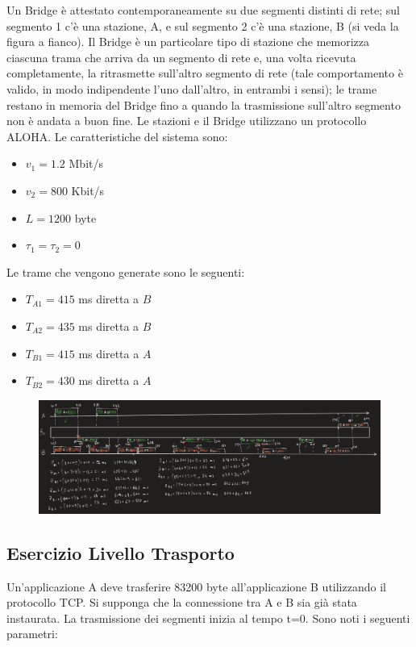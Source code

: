 \documentclass[a4paper]{article}
\begin{document}
Un Bridge è attestato contemporaneamente su due segmenti distinti di
rete; sul segmento 1 c’è una stazione, A, e sul segmento 2 c’è una
stazione, B (si veda la figura a fianco). Il Bridge è un particolare tipo di
stazione che memorizza ciascuna trama che arriva da un segmento di
rete e, una volta ricevuta completamente, la ritrasmette sull’altro
segmento di rete (tale comportamento è valido, in modo indipendente
l’uno dall’altro, in entrambi i sensi); le trame restano in memoria del
Bridge fino a quando la trasmissione sull’altro segmento non è andata
a buon fine. Le stazioni e il Bridge utilizzano un protocollo ALOHA. Le caratteristiche del sistema sono:
\begin{itemize}
    \item $v_1 = 1.2$ Mbit/s
    \item $v_2 = 800$ Kbit/s
    \item $L = 1200$ byte
    \item $\tau_1 = \tau_2 = 0$
\end{itemize}
Le trame che vengono generate sono le seguenti:
\begin{itemize}
    \item $T_{A1} = 415$ ms diretta a $B$
    \item $T_{A2} = 435$ ms diretta a $B$
    \item $T_{B1} = 415$ ms diretta a $A$
    \item $T_{B2} = 430$ ms diretta a $A$
\end{itemize}
\begin{figure}[H]
    \centering
    \includegraphics[width=1\textwidth]{ESDL1.png}
\end{figure}


\subsection{Esercizio Livello Trasporto}

Un’applicazione A deve trasferire 83200 byte all’applicazione B utilizzando il protocollo TCP. Si supponga che
la connessione tra A e B sia già stata instaurata. La trasmissione dei segmenti inizia al tempo t=0. Sono noti i
seguenti parametri:
\end{document}
